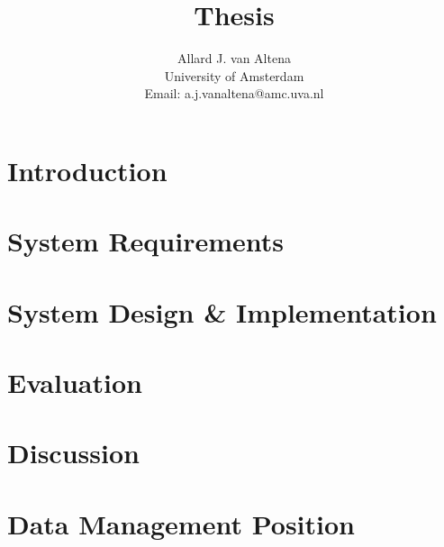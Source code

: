 \documentclass[a4paper]{report}
\title{Thesis}
\author{
	Allard J. van Altena\\
	University of Amsterdam\\
	Email: a.j.vanaltena@amc.uva.nl
}
\newif\ifstructure
\begin{document}
	
	
	\chapter{Introduction}
	\label{introduction}
	
	\ifstructure
		
	\else
		
	\fi
	
	\chapter{System Requirements}
	\label{requirements}
	
	\ifstructure
			
		
		
	\else
		
		
		
		
		
		
	\fi
	
	\chapter{System Design \& Implementation}
	\label{system-functionality}
	
	\ifstructure
			
		
	\else
		
		
		
	\fi
	
	\chapter{Evaluation}
	\label{evaluation}
	
	\ifstructure
		
	\else
		
	\fi
	
	\chapter{Discussion}
	\label{discussion}
	
	\ifstructure
		
	\else
		
	\fi
	
	\chapter{Data Management Position}
	\label{position}
	
\end{document}
